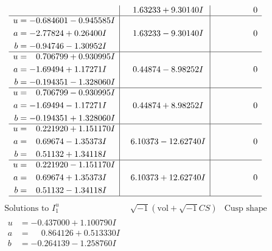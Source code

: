 \documentclass[1p]{elsarticle_modified}
\theoremstyle{definition}
\newcommand{\I}{\sqrt{-1}}
\begin{document}
$$\begin{array}{c|c|c}
 & \phantom{-}1.63233 + 9.30140 I & \phantom{-0.000000 } 0 \\ \hline\begin{aligned}
u &= -0.684601 - 0.945585 I \\
a &= -2.77824 + 0.26400 I \\
b &= -0.94746 - 1.30952 I\end{aligned}
 & \phantom{-}1.63233 - 9.30140 I & \phantom{-0.000000 } 0 \\ \hline\begin{aligned}
u &= \phantom{-}0.706799 + 0.930995 I \\
a &= -1.69494 + 1.17271 I \\
b &= -0.194351 - 1.328060 I\end{aligned}
 & \phantom{-}0.44874 - 8.98252 I & \phantom{-0.000000 } 0 \\ \hline\begin{aligned}
u &= \phantom{-}0.706799 - 0.930995 I \\
a &= -1.69494 - 1.17271 I \\
b &= -0.194351 + 1.328060 I\end{aligned}
 & \phantom{-}0.44874 + 8.98252 I & \phantom{-0.000000 } 0 \\ \hline\begin{aligned}
u &= \phantom{-}0.221920 + 1.151170 I \\
a &= \phantom{-}0.69674 - 1.35373 I \\
b &= \phantom{-}0.51132 + 1.34118 I\end{aligned}
 & \phantom{-}6.10373 - 12.62740 I & \phantom{-0.000000 } 0 \\ \hline\begin{aligned}
u &= \phantom{-}0.221920 - 1.151170 I \\
a &= \phantom{-}0.69674 + 1.35373 I \\
b &= \phantom{-}0.51132 - 1.34118 I\end{aligned}
 & \phantom{-}6.10373 + 12.62740 I & \phantom{-0.000000 } 0\\
 \hline 
 \end{array}$$\newpage$$\begin{array}{c|c|c}  
\text{Solutions to }I^u_{1}& \I (\text{vol} + \sqrt{-1}CS) & \text{Cusp shape}\\
 \hline 
\begin{aligned}
u &= -0.437000 + 1.100790 I \\
a &= \phantom{-}0.864126 + 0.513330 I \\
b &= -0.264139 - 1.258760 I\end{aligned}

\end{array}$$
\end{document}
